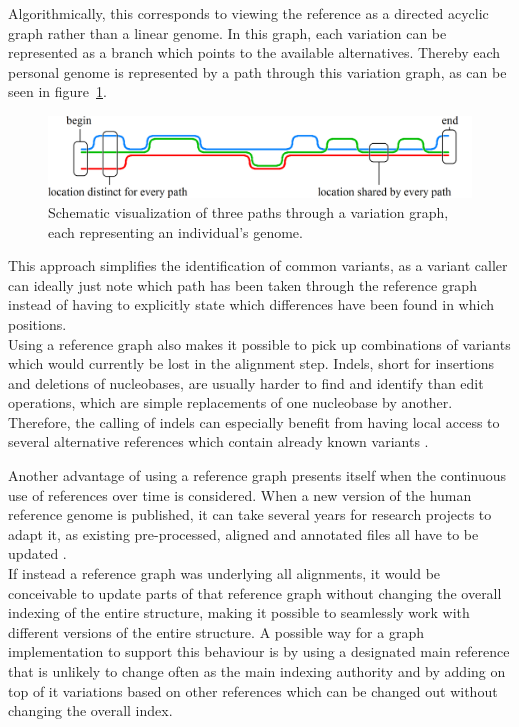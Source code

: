 \documentclass[a4paper,12pt,twoside,BCOR=10mm]{scrbook}
\begin{document}
Algorithmically, this corresponds to viewing the reference as a directed acyclic graph rather than a linear genome.
In this graph, each variation can be represented as a branch which points to the available alternatives.
Thereby each personal genome is represented by a path through this variation graph,
as can be seen in figure~\ref{fig:evo_intro_three_ref_seq_align}. \\
\begin{figure}[!htb]
\centering
\includegraphics[width=\textwidth]{evo_intro_three_ref_seq_align.png}
\caption[Schematic visualization of three paths through a variation graph]{Schematic visualization of three paths through a variation graph, each representing an individual's genome.} \label{fig:evo_intro_three_ref_seq_align}
\end{figure}
This approach simplifies the identification of common variants, as a variant caller can
ideally just note which path has been taken through the reference graph instead of having to
explicitly state which differences have been found in which positions. \\
Using a reference graph also makes it possible to pick up combinations of variants
which would currently be lost in the alignment step.
Indels, short for insertions and deletions of nucleobases,
are usually harder to find and identify than edit operations,
which are simple replacements of one nucleobase by another.
Therefore, the calling of indels can especially
benefit from having local access to several alternative references which contain
already known variants \citep{Albers2010}.

Another advantage of using a reference graph presents itself when the continuous use of
references over time is considered.
When a new version of the human reference genome is published,
it can take several years for research projects to adapt it,
as existing pre-processed, aligned and annotated files all have to be updated \citep{RedditSwitchTo38}. \\
If instead a reference graph was underlying all alignments, it would be conceivable
to update parts of that reference graph without changing the overall indexing of the entire structure,
making it possible to seamlessly work with different versions of the entire structure.
A possible way for a graph implementation to support this behaviour is by using a designated main
reference that is unlikely to change often as the main indexing authority and by adding on top of it
variations based on other references which can be changed out without changing the overall index.
\end{document}
